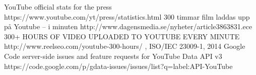 \begin{thebibliography}{2}
		YouTube official stats for the press
		https://www.youtube.com/yt/press/statistics.html
		300 timmar film laddas upp på Youtube – i minuten
		http://www.dagensmedia.se/nyheter/article3863831.ece
		300+ HOURS OF VIDEO UPLOADED TO YOUTUBE EVERY MINUTE
		http://www.reelseo.com/youtube-300-hours/
		,
		ISO/IEC 23009-1, 2014
		Google Code server-side issues and feature requests for YouTube Data API v3
		https://code.google.com/p/gdata-issues/issues/list?q=label:API-YouTube
\end{thebibliography}
